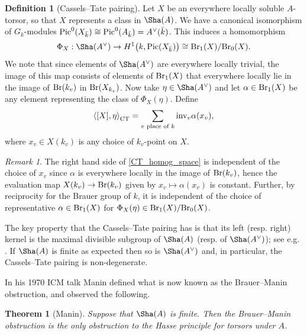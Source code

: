 \documentclass[10pt]{amsart}
\numberwithin{equation}{section}
\newtheorem{theorem}[equation]{Theorem}
\theoremstyle{remark}
\newtheorem{remark}[equation]{Remark}
\theoremstyle{definition}
\theoremstyle{definition}
\theoremstyle{definition}
\newtheorem{defi}[equation]{Definition}
\theoremstyle{definition}
\theoremstyle{definition}
\theoremstyle{definition}
\theoremstyle{definition}
\theoremstyle{definition}
\begin{document}
\begin{defi}[Cassels--Tate pairing]
Let $X$ be an everywhere locally soluble $A$-torsor, so that $X$ represents a class in $\Sha(A)$. We have a canonical isomorphism of $G_k$-modules $\textup{Pic}^0(X_{\bar{k}})\cong  \textup{Pic}^0(A_{\bar{k}})=A^\vee(\bar{k})$.  This induces a homomorphism
\[\Phi_X: \Sha(A^\vee)\to H^1\big(k,\textup{Pic}(X_{\bar{k}})\big)\cong  \textup{Br}_1(X)/\textup{Br}_0(X).\]
We note that since elements of $\Sha(A^\vee)$ are everywhere locally trivial, the image of this map consists of elements of $\textup{Br}_1(X)$ that everywhere locally lie in the image of $\textup{Br}(k_v)$ in $\textup{Br}(X_{k_v})$. Now take $\eta\in \Sha(A^\vee)$ and let $\alpha \in \textup{Br}_1(X)$ be any element representing the class of $\Phi_X(\eta)$. Define 
\begin{equation} \label{CT_homog_space}
\left \langle [X], \eta\right \rangle_{\textup{CT}}=\sum_{v\textup{ place of }k}\textup{inv}_v\alpha(x_v),
\end{equation}
where $x_v\in X(k_v)$ is any choice of $k_v$-point on $X$. 
\end{defi}

\begin{remark}
The right hand side of \eqref{CT_homog_space} is independent of the choice of $x_v$ since $\alpha$ is everywhere locally in the image of $\textup{Br}(k_v)$, hence the evaluation map  $X(k_v)\to \textup{Br}(k_v)$ given by $x_v\mapsto \alpha(x_v)$ is constant. Further, by reciprocity for the Brauer group of $k$, it is independent of the choice of representative $\alpha \in \textup{Br}_1(X)$ for $\Phi_X(\eta)\in \textup{Br}_1(X)/\textup{Br}_0(X)$. 
\end{remark}

The key property that the Cassels--Tate pairing has is that its left (resp. right) kernel is the maximal divisible subgroup of $\Sha(A)$ (resp. of $\Sha(A^\vee)$); see e.g. \cite[Chapter I.6]{MR2261462}. If $\Sha(A)$ is finite as expected then so is $\Sha(A^\vee)$ and, in particular, the Cassels--Tate pairing is non-degenerate.  

In his 1970 ICM talk  Manin \cite{Man70} defined what is now known as the Brauer--Manin obstruction, and observed the following. 

\begin{theorem}[Manin] 
Suppose that $\Sha(A)$ is finite. Then the Brauer--Manin obstruction is the only obstruction to  the Hasse principle for torsors under $A$. 
\end{theorem}
\end{document}
